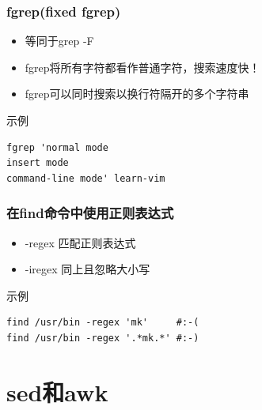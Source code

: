 \documentclass[xcolor=svgnames,presentation]{beamer}
\begin{document}
\begin{frame}[fragile]
\frametitle{fgrep(fixed fgrep)}
\label{sec-1-1-11}
\begin{itemize}

\item 等同于grep -F
\label{sec-1-1-11-1}%

\item fgrep将所有字符都看作普通字符，搜索速度快！
\label{sec-1-1-11-2}%

\item fgrep可以同时搜索以换行符隔开的多个字符串
\label{sec-1-1-11-3}%
\end{itemize} %
\begin{exampleblock}{示例}
\label{sec-1-1-11-4}


\begin{verbatim}
fgrep 'normal mode
insert mode
command-line mode' learn-vim
\end{verbatim}
\end{exampleblock}
\end{frame}
\begin{frame}[fragile]
\frametitle{在find命令中使用正则表达式}
\label{sec-1-1-12}
\begin{itemize}

\item -regex 匹配正则表达式
\label{sec-1-1-12-1}%

\item -iregex 同上且忽略大小写
\label{sec-1-1-12-2}%
\end{itemize} %
\begin{exampleblock}{示例}
\label{sec-1-1-12-3}


\begin{verbatim}
find /usr/bin -regex 'mk'     #:-(
find /usr/bin -regex '.*mk.*' #:-)
\end{verbatim}
\end{exampleblock}
\end{frame}
\section{sed和awk}
\label{sec-2}
\end{document}
